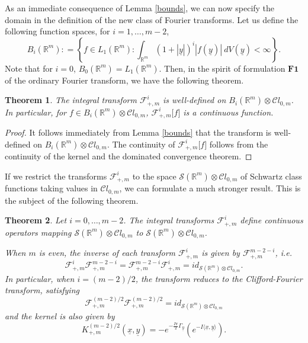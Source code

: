 \documentclass{amsart}
\newtheorem{theorem}{Theorem}[section]
\theoremstyle{remark}
\begin{document}
As an immediate consequence of Lemma \ref{bounds}, we can now specify the domain in the definition of the new class of Fourier transforms. Let us define the following function spaces, for $i = 1, \ldots, m-2$,
$$
B_{i}({{\mathbb R}}^m) : = \left\{ f\in L_{1}({{\mathbb R}}^m): \int_{{{\mathbb R}}^m} (1+|{\underline{y}}|)^{i} | f({\underline{y}})| \ dV({\underline{y}}) < \infty \right\}.
$$
Note that for $i=0$, $B_{0}({{\mathbb R}}^m) =L_{1}({{\mathbb R}}^m)$.
Then, in the spirit of formulation $\textbf{F1}$ of the ordinary Fourier transform, we have the following theorem.

\begin{theorem} \label{CFdomain}
The integral transform  $\mathcal{F}^{i}_{+,m}$ is well-defined on $B_{i}({{\mathbb R}}^m) \otimes {\mathcal{C}} l_{0,m}$. In particular, for $f \in B_{i}({{\mathbb R}}^m) \otimes {\mathcal{C}} l_{0,m}$, $\mathcal{F}^{i}_{+,m}\lbrack f \rbrack$ is a continuous function.
\end{theorem}

\begin{proof}
It follows immediately from Lemma \ref{bounds} that the transform is well-defined on $B_{i}({{\mathbb R}}^m) \otimes {\mathcal{C}} l_{0,m}$. The continuity of $\mathcal{F}^{i}_{+,m}\lbrack f \rbrack$ follows from the continuity of the kernel and the dominated convergence theorem.
\end{proof}

If we restrict the transforms $\mathcal{F}^{i}_{+,m}$ to the space $\mathcal{S}(\mathbb{R}^m) \otimes {\mathcal{C}} l_{0,m}$ of Schwartz class functions taking values in ${\mathcal{C}} l_{0,m}$, we can formulate a much stronger result. This is the subject of the following theorem.

\begin{theorem}
\label{TFonS}
Let $i= 0, \ldots, m-2$. The integral transforms $\mathcal{F}^{i}_{+,m}$ define continuous operators mapping $\mathcal{S}(\mathbb{R}^m) \otimes {\mathcal{C}} l_{0,m}$ to $\mathcal{S}(\mathbb{R}^m) \otimes {\mathcal{C}} l_{0,m}$.

When $m$ is even, the inverse of each transform $\mathcal{F}^{i}_{+,m}$ is given by $\mathcal{F}^{m-2-i}_{+,m}$, i.e.
\[
\mathcal{F}^{i}_{+,m} \mathcal{F}^{m-2-i}_{+,m} = \mathcal{F}^{m-2-i}_{+,m} \mathcal{F}^{i}_{+,m} = id_{\mathcal{S}(\mathbb{R}^m) \otimes {\mathcal{C}} l_{0,m}}.
\]
In particular, when $i = (m-2)/2$, the transform reduces to the Clifford-Fourier transform, satisfying
\[
\mathcal{F}^{(m-2)/2}_{+,m} \mathcal{F}^{(m-2)/2}_{+,m} = id_{\mathcal{S}(\mathbb{R}^m) \otimes {\mathcal{C}} l_{0,m}}
\]
and the kernel is also given by
\begin{equation}
\label{CFexpr}
K^{(m-2)/2}_{+,m}({\underline{x}},{\underline{y}}) =  - e^{- \frac{I \pi}{2}\Gamma_{\underline{y}}  } \left( e^{-I {{\langle}} {\underline{x}}, {\underline{y}} {{\rangle}}} \right).
\end{equation}
\end{theorem}
\end{document}
